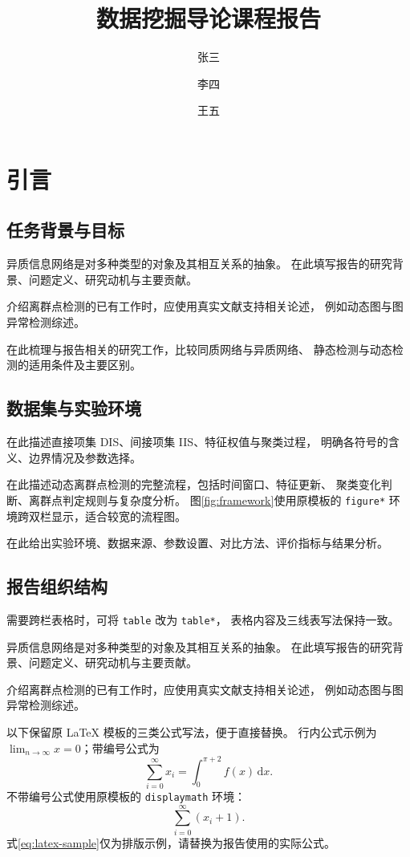 \documentclass[sigconf,nonacm,screen]{acmart}
\title[数据挖掘导论课程报告]{数据挖掘导论课程报告}
\author{张三}
\affiliation{%
  \institution{ZY2506xxx}
  \city{计算机学院}
}
\author{李四}
\affiliation{%
  \institution{ZY2506xxx}
  \city{计算机学院}
}
\author{王五}
\affiliation{%
  \institution{ZY2506xxx}
  \city{计算机学院}
}
\begin{document}
\maketitle
\section{引言}
\label{sec:intro}
\subsection{任务背景与目标}
\label{sec:sub11}
异质信息网络是对多种类型的对象及其相互关系的抽象。
在此填写报告的研究背景、问题定义、研究动机与主要贡献。

介绍离群点检测的已有工作时，应使用真实文献支持相关论述，
例如动态图与图异常检测综述\cite{akoglu2015}。

在此梳理与报告相关的研究工作，比较同质网络与异质网络、
静态检测与动态检测的适用条件及主要区别。

\subsection{数据集与实验环境}
\label{sec:sub12}
在此描述直接项集 DIS、间接项集 IIS、特征权值与聚类过程，
明确各符号的含义、边界情况及参数选择。

在此描述动态离群点检测的完整流程，包括时间窗口、特征更新、
聚类变化判断、离群点判定规则与复杂度分析。
图\ref{fig:framework}使用原模板的 \texttt{figure*} 环境跨双栏显示，适合较宽的流程图。

在此给出实验环境、数据来源、参数设置、对比方法、评价指标与结果分析。

\subsection{报告组织结构}
\label{sec:sub13}
需要跨栏表格时，可将 \texttt{table} 改为 \texttt{table*}，
表格内容及三线表写法保持一致。

异质信息网络是对多种类型的对象及其相互关系的抽象。
在此填写报告的研究背景、问题定义、研究动机与主要贡献。

介绍离群点检测的已有工作时，应使用真实文献支持相关论述，
例如动态图与图异常检测综述\cite{akoglu2015}。

以下保留原 LaTeX 模板的三类公式写法，便于直接替换。
行内公式示例为 $\lim_{n\to\infty}x=0$；带编号公式为
\begin{equation}
  \sum_{i=0}^{\infty}x_i=\int_{0}^{\pi+2}f(x)\,\mathrm dx.
  \label{eq:latex-sample}
\end{equation}
不带编号公式使用原模板的 \texttt{displaymath} 环境：
\begin{displaymath}
  \sum_{i=0}^{\infty}(x_i+1).
\end{displaymath}
式\eqref{eq:latex-sample}仅为排版示例，请替换为报告使用的实际公式。
\end{document}
